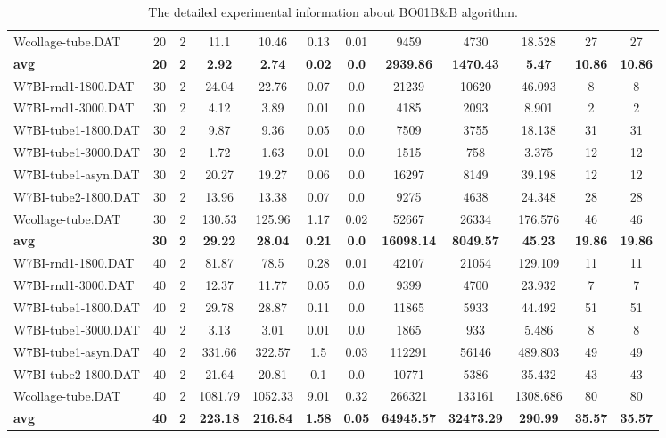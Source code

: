 \begin{table}[!h]
{\begin{tabular}{lccccccccccc}
Wcollage-tube.DAT & 20 & 2 & 11.1 & 10.46 & 0.13 & 0.01 & 9459 & 4730 & 18.528 & 27 & 27\\
\cline{1-12} \textbf{avg} & \textbf{20} & \textbf{2} & \textbf{2.92} & \textbf{2.74} & \textbf{0.02} & \textbf{0.0} & \textbf{2939.86} & \textbf{1470.43} & \textbf{5.47} & \textbf{10.86} & \textbf{10.86} \\ \cline{1-12}
W7BI-rnd1-1800.DAT & 30 & 2 & 24.04 & 22.76 & 0.07 & 0.0 & 21239 & 10620 & 46.093 & 8 & 8\\
W7BI-rnd1-3000.DAT & 30 & 2 & 4.12 & 3.89 & 0.01 & 0.0 & 4185 & 2093 & 8.901 & 2 & 2\\
W7BI-tube1-1800.DAT & 30 & 2 & 9.87 & 9.36 & 0.05 & 0.0 & 7509 & 3755 & 18.138 & 31 & 31\\
W7BI-tube1-3000.DAT & 30 & 2 & 1.72 & 1.63 & 0.01 & 0.0 & 1515 & 758 & 3.375 & 12 & 12\\
W7BI-tube1-asyn.DAT & 30 & 2 & 20.27 & 19.27 & 0.06 & 0.0 & 16297 & 8149 & 39.198 & 12 & 12\\
W7BI-tube2-1800.DAT & 30 & 2 & 13.96 & 13.38 & 0.07 & 0.0 & 9275 & 4638 & 24.348 & 28 & 28\\
Wcollage-tube.DAT & 30 & 2 & 130.53 & 125.96 & 1.17 & 0.02 & 52667 & 26334 & 176.576 & 46 & 46\\
\cline{1-12} \textbf{avg} & \textbf{30} & \textbf{2} & \textbf{29.22} & \textbf{28.04} & \textbf{0.21} & \textbf{0.0} & \textbf{16098.14} & \textbf{8049.57} & \textbf{45.23} & \textbf{19.86} & \textbf{19.86} \\ \cline{1-12}
W7BI-rnd1-1800.DAT & 40 & 2 & 81.87 & 78.5 & 0.28 & 0.01 & 42107 & 21054 & 129.109 & 11 & 11\\
W7BI-rnd1-3000.DAT & 40 & 2 & 12.37 & 11.77 & 0.05 & 0.0 & 9399 & 4700 & 23.932 & 7 & 7\\
W7BI-tube1-1800.DAT & 40 & 2 & 29.78 & 28.87 & 0.11 & 0.0 & 11865 & 5933 & 44.492 & 51 & 51\\
W7BI-tube1-3000.DAT & 40 & 2 & 3.13 & 3.01 & 0.01 & 0.0 & 1865 & 933 & 5.486 & 8 & 8\\
W7BI-tube1-asyn.DAT & 40 & 2 & 331.66 & 322.57 & 1.5 & 0.03 & 112291 & 56146 & 489.803 & 49 & 49\\
W7BI-tube2-1800.DAT & 40 & 2 & 21.64 & 20.81 & 0.1 & 0.0 & 10771 & 5386 & 35.432 & 43 & 43\\
Wcollage-tube.DAT & 40 & 2 & 1081.79 & 1052.33 & 9.01 & 0.32 & 266321 & 133161 & 1308.686 & 80 & 80\\
\cline{1-12} \textbf{avg} & \textbf{40} & \textbf{2} & \textbf{223.18} & \textbf{216.84} & \textbf{1.58} & \textbf{0.05} & \textbf{64945.57} & \textbf{32473.29} & \textbf{290.99} & \textbf{35.57} & \textbf{35.57} \\ \cline{1-12}
\bottomrule
\end{tabular}%
}%
\caption{The detailed experimental information about BO01B\&B algorithm.}
\label{tab:table_bb}
\end{table}

